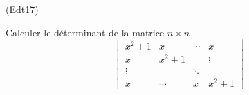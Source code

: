 \begin{tiny}(Edt17)\end{tiny} Calculer le déterminant de la matrice $n\times n$
\begin{displaymath}
 \begin{vmatrix}
  x^2+1 &  x     & \cdots & x     \\
  x     & x^2+1  &        &\vdots \\
\vdots  &        & \ddots &       \\
x       & \cdots &    x   & x^2+1    
 \end{vmatrix}
\end{displaymath}

